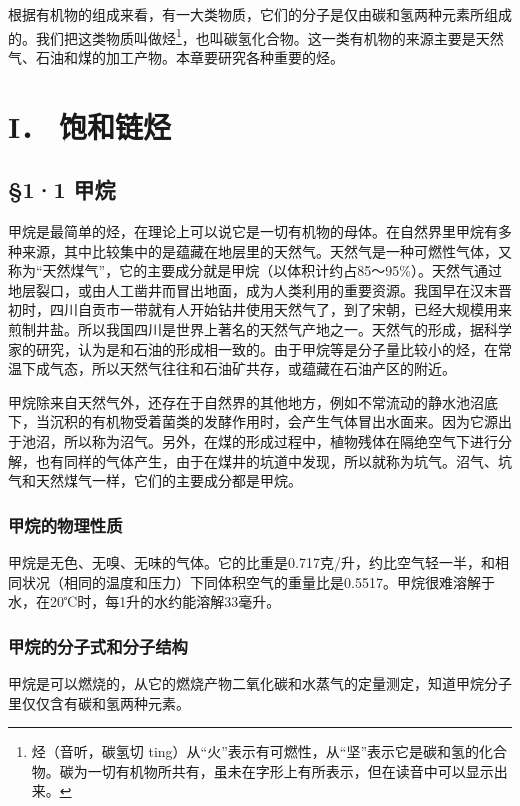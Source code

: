根据有机物的组成来看，有一大类物质，它们的分子是仅由碳和氢两种元素所组成的。我们把这类物质叫做烃\footnote{烃（音听，碳氢切
  ting）从``火''表示有可燃性，从``坚''表示它是碳和氢的化合物。碳为一切有机物所共有，虽未在字形上有所表示，但在读音中可以显示出来。}，也叫碳氢化合物。这一类有机物的来源主要是天然气、石油和煤的加工产物。本章要研究各种重要的烃。

\section{I． 饱和链烃}\label{i-ux9971ux548cux94feux70c3}

\subsection{§1·1 甲烷}

甲烷是最简单的烃，在理论上可以说它是一切有机物的母体。在自然界里甲烷有多种来源，其中比较集中的是蕴藏在地层里的天然气。天然气是一种可燃性气体，又称为``天然煤气''，它的主要成分就是甲烷（以体积计约占85～95\%）。天然气通过地层裂口，或由人工凿井而冒出地面，成为人类利用的重要资源。我国早在汉末晋初时，四川自贡市一带就有人开始钻井使用天然气了，到了宋朝，已经大规模用来煎制井盐。所以我国四川是世界上著名的天然气产地之一。天然气的形成，据科学家的研究，认为是和石油的形成相一致的。由于甲烷等是分子量比较小的烃，在常温下成气态，所以天然气往往和石油矿共存，或蕴藏在石油产区的附近。

甲烷除来自天然气外，还存在于自然界的其他地方，例如不常流动的静水池沼底下，当沉积的有机物受着菌类的发酵作用时，会产生气体冒出水面来。因为它源出于池沼，所以称为沼气。另外，在煤的形成过程中，植物残体在隔绝空气下进行分解，也有同样的气体产生，由于在煤井的坑道中发现，所以就称为坑气。沼气、坑气和天然煤气一样，它们的主要成分都是甲烷。

\subsubsection{甲烷的物理性质}

甲烷是无色、无嗅、无味的气体。它的比重是0.717克/升，约比空气轻一半，和相同状况（相同的温度和压力）下同体积空气的重量比是0.5517。甲烷很难溶解于水，在20℃时，每1升的水约能溶解33毫升。

\subsubsection{甲烷的分子式和分子结构}

甲烷是可以燃烧的，从它的燃烧产物二氧化碳和水蒸气的定量测定，知道甲烷分子里仅仅含有碳和氢两种元素。

